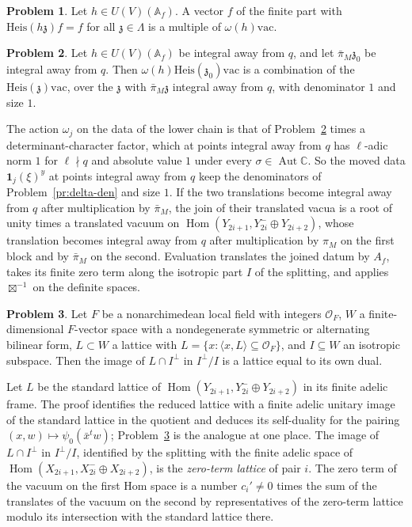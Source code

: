 \documentclass[reqno]{amsart}
\theoremstyle{definition}
\newtheorem{problem}{Problem}[section]
\theoremstyle{plain}
\newcommand{\C}{\mathbb{C}}
\newcommand{\Oc}{\mathcal{O}}
\newcommand{\Hom}{\operatorname{Hom}}
\newcommand{\Aut}{\operatorname{Aut}}
\newcommand{\Heis}{\mathrm{Heis}}
\newcommand{\vac}{\mathrm{vac}}
\newcommand{\z}{{\mathfrak{z}}}
\begin{document}
\begin{problem}\label{pr:line}
Let \(h\in U(V)(\mathbb A_f)\).  A vector \(f\) of the finite part with \(\Heis(h\z)f=f\) for all \(\z\in\Lambda\) is a multiple of \(\omega(h)\vac\).
\end{problem}

\begin{problem}\label{pr:move}
Let \(h\in U(V)(\mathbb A_f)\) be integral away from \(q\), and let \(\bar\pi_M\z_0\) be integral away from \(q\).  Then \(\omega(h)\Heis(\z_0)\vac\) is a combination of the \(\Heis(\z)\vac\), over the \(\z\) with \(\bar\pi_M\z\) integral away from \(q\), with denominator \(1\) and size \(1\).
\end{problem}

The action \(\omega_j\) on the data of the lower chain is that of Problem~\ref{pr:move} times a determinant-character factor, which at points integral away from \(q\) has \(\ell\)-adic norm \(1\) for \(\ell\nmid q\) and absolute value \(1\) under every \(\sigma\in\Aut\C\).  So the moved data \(\mathbf 1_j(\xi)^y\) at points integral away from \(q\) keep the denominators of Problem~\ref{pr:delta-den} and size \(1\).  If the two translations become integral away from \(q\) after multiplication by \(\bar\pi_M\), the join of their translated vacua is a root of unity times a translated vacuum on \(\Hom(Y_{2i+1},Y_{2i}^-\oplus Y_{2i+2})\), whose translation becomes integral away from \(q\) after multiplication by \(\pi_M\) on the first block and by \(\bar\pi_M\) on the second.  Evaluation translates the joined datum by \(A_f\), takes its finite zero term along the isotropic part \(I\) of the splitting, and applies \(\boxtimes^{-1}\) on the definite spaces.

\begin{problem}\label{pr:reduction}
Let \(F\) be a nonarchimedean local field with integers \(\Oc_F\), \(W\) a finite-dimensional \(F\)-vector space with a nondegenerate symmetric or alternating bilinear form, \(L\subset W\) a lattice with \(L=\{x:\langle x,L\rangle\subseteq\Oc_F\}\), and \(I\subseteq W\) an isotropic subspace.  Then the image of \(L\cap I^\perp\) in \(I^\perp/I\) is a lattice equal to its own dual.
\end{problem}

Let \(L\) be the standard lattice of \(\Hom(Y_{2i+1},Y_{2i}^-\oplus Y_{2i+2})\) in its finite adelic frame.  The proof identifies the reduced lattice with a finite adelic unitary image of the standard lattice in the quotient and deduces its self-duality for the pairing \((x,w)\mapsto\psi_0(\bar x^tw)\); Problem~\ref{pr:reduction} is the analogue at one place.  The image of \(L\cap I^\perp\) in \(I^\perp/I\), identified by the splitting with the finite adelic space of \(\Hom(X_{2i+1},X_{2i}^-\oplus X_{2i+2})\), is the \emph{zero-term lattice} of pair \(i\).  The zero term of the vacuum on the first Hom space is a number \(c_i'\ne0\) times the sum of the translates of the vacuum on the second by representatives of the zero-term lattice modulo its intersection with the standard lattice there.
\end{document}
